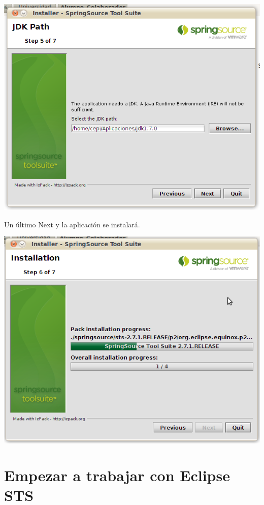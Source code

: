 \documentclass[a4paper,12pt,spanish]{article}
\begin{document}
\begin{center}
\includegraphics[scale=0.45]{ide5}
\end{center}

Un último Next y la aplicación se instalará.

\begin{center}
\includegraphics[scale=0.45]{ide6}
\end{center}

\section{Empezar a trabajar con Eclipse STS}
\end{document}
